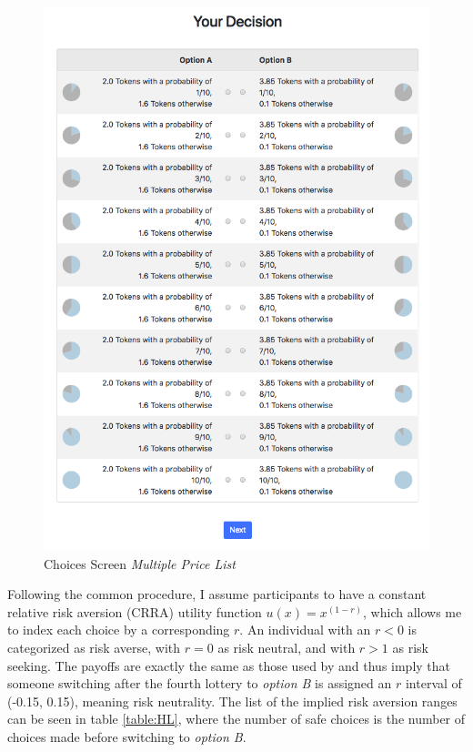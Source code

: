      \begin{figure}
         \centering
         \includegraphics[scale=0.4]{graphs/Choices_MPL.png}
         \caption{Choices Screen \textit{Multiple Price List}}
         \label{fig:choices_mpl}
     \end{figure}
     
     
    Following the common procedure, I assume participants to have a constant relative risk aversion (CRRA) utility function $u(x)=x^{(1-r)}$, which allows me to index each choice by a corresponding $r$. An individual with an $r<0$ is categorized as risk averse, with $r=0$ as risk neutral, and with $r>1$ as risk seeking. The payoffs are exactly the same as those used by \cite{holt2002} and thus imply that someone switching after the fourth lottery to \textit{option B} is assigned an $r$ interval of (-0.15, 0.15), meaning risk neutrality. The list of the implied risk aversion ranges can be seen in table \ref{table:HL}, where the number of safe choices is the number of choices made before switching to \textit{option B}.
    

